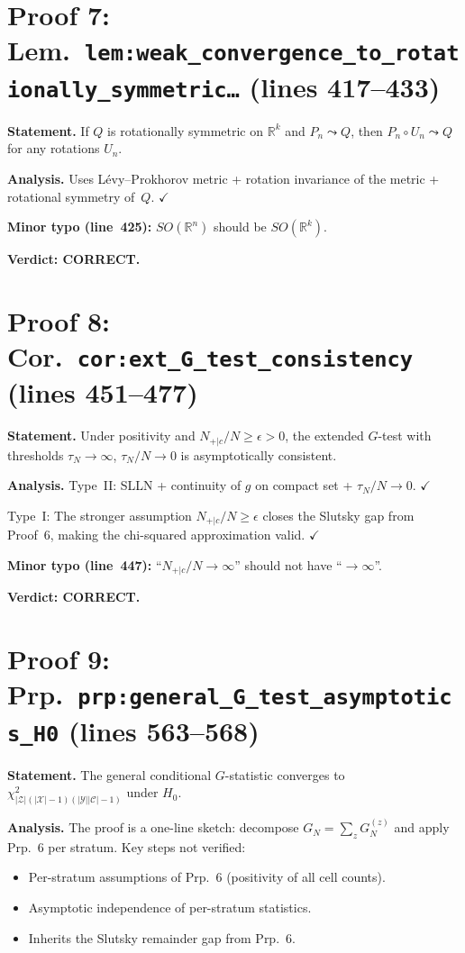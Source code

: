 \documentclass{article}
\begin{document}
\section{Proof 7: Lem.\ \texttt{lem:weak\_convergence\_to\_rotationally\_symmetric\ldots}
(lines 417--433)}

\textbf{Statement.} If $Q$ is rotationally symmetric on $\mathbb{R}^k$ and
$P_n\leadsto Q$, then $P_n\circ U_n\leadsto Q$ for any rotations $U_n$.

\textbf{Analysis.}
Uses L\'evy--Prokhorov metric + rotation invariance of the metric
+ rotational symmetry of~$Q$.  $\checkmark$

\textbf{Minor typo (line~425):} $SO(\mathbb{R}^n)$ should be $SO(\mathbb{R}^k)$.

\textbf{Verdict: CORRECT.}

\section{Proof 8: Cor.\ \texttt{cor:ext\_G\_test\_consistency}
(lines 451--477)}

\textbf{Statement.} Under positivity and $N_{+|c}/N\ge\epsilon>0$,
the extended $G$-test with thresholds $\tau_N\to\infty$, $\tau_N/N\to 0$
is asymptotically consistent.

\textbf{Analysis.}
Type~II: SLLN + continuity of $g$ on compact set + $\tau_N/N\to 0$.  $\checkmark$

Type~I: The stronger assumption $N_{+|c}/N\ge\epsilon$ closes the Slutsky
gap from Proof~6, making the chi-squared approximation valid.  $\checkmark$

\textbf{Minor typo (line~447):} ``$N_{+|c}/N\to\infty$'' should not have
``$\to\infty$''.

\textbf{Verdict: CORRECT.}

\section{Proof 9: Prp.\ \texttt{prp:general\_G\_test\_asymptotics\_H0}
(lines 563--568)}

\textbf{Statement.} The general conditional $G$-statistic converges to
$\chi^2_{|\mathcal{Z}|(|\mathcal{X}|-1)(|\mathcal{Y}||\mathcal{C}|-1)}$
under $H_0$.

\textbf{Analysis.}
The proof is a one-line sketch: decompose $G_N=\sum_z G_N^{(z)}$ and apply
Prp.~6 per stratum.  Key steps not verified:
\begin{itemize}
  \item Per-stratum assumptions of Prp.~6 (positivity of all cell counts).
  \item Asymptotic independence of per-stratum statistics.
  \item Inherits the Slutsky remainder gap from Prp.~6.
\end{itemize}
\end{document}
